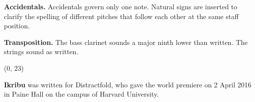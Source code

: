 \documentclass[10pt]{article}
\begin{document}
\begin{textblock}{23}
\textbf{Accidentals.} Accidentals govern only one note. Natural signs are
inserted to clarify the spelling of different pitches that follow each other at
the same staff position.

\textbf{Transposition.} The bass clarinet sounds a major ninth lower than
written. The strings sound as written.

\end{textblock}

\begin{textblock}{23}(0, 23)

\textbf{Ikribu} was written for Distractfold, who gave the world premiere on 2
April 2016 in Paine Hall on the campus of Harvard University.

\end{textblock}
\end{document}
